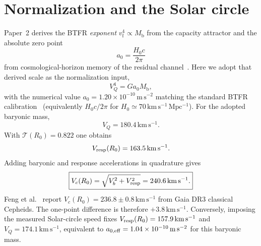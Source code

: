 \documentclass[11pt]{article}
\theoremstyle{definition}
\theoremstyle{remark}
\newcommand{\kms}{\mathrm{km\,s^{-1}}}
\newcommand{\Mb}{M_{\mathrm{b}}}
\begin{document}
\section{Normalization and the Solar circle}
\label{sec:solar}
Paper~2 derives the BTFR \emph{exponent} $v_{\mathrm{f}}^{4}\propto\Mb$ from the capacity attractor and the absolute zero point
\begin{equation}
  a_0=\frac{H_0c}{2\pi}
\end{equation}
from cosmological-horizon memory of the residual channel~\cite{boyd2026galactic}.
Here we adopt that derived scale as the normalization input,
\begin{equation}
V_Q^4=Ga_0\Mb,
\end{equation}
with the numerical value $a_0=1.20\times10^{-10}\,\mathrm{m\,s^{-2}}$ matching the standard BTFR calibration~\cite{mcgaugh2012,lelli2016} (equivalently $H_0c/2\pi$ for $H_0\simeq70\,\mathrm{km\,s^{-1}\,Mpc^{-1}}$).
For the adopted baryonic mass,
\begin{equation}
V_Q=180.4\,\kms.
\end{equation}
With $\mathcal T(R_0)=0.822$ one obtains
\begin{equation}
V_{\rm resp}(R_0)=163.5\,\kms.
\end{equation}
Adding baryonic and response accelerations in quadrature gives
\begin{equation}
\label{eq:VcR0}
\boxed{V_c(R_0)=\sqrt{V_b^2+V_{\rm resp}^2}=240.6\,\kms.}
\end{equation}
Feng et al.~\cite{Feng2026} report $V_c(R_0)=236.8\pm0.8\,\kms$ from Gaia DR3 classical Cepheids.
The one-point difference is therefore $+3.8\,\kms$.
Conversely, imposing the measured Solar-circle speed fixes $V_{\rm resp}(R_0)=157.9\,\kms$ and $V_Q=174.1\,\kms$, equivalent to $a_{0,\rm eff}=1.04\times10^{-10}\,\mathrm{m\,s^{-2}}$ for this baryonic mass.
\end{document}
